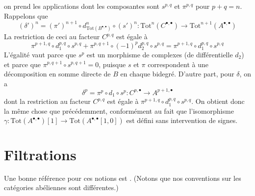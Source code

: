 \begin{remark}
on prend les applications dont les composantes sont $s^{p, q}$ et $\pi^{p, q}$
pour $p + q = n$. Rappelons que
$$
(\delta')^n =
(\pi')^{n + 1} \circ d_{\text{Tot}(B^{\bullet, \bullet})}^n \circ (s')^n :
\text{Tot}^n(C^{\bullet, \bullet}) \to
\text{Tot}^{n + 1}(A^{\bullet, \bullet})
$$
La restriction de ceci au facteur $C^{p, q}$ est égale à
$$
\pi^{p + 1, q} \circ
d_1^{p, q} \circ
s^{p, q} +
\pi^{p, q + 1} \circ
(-1)^p d_2^{p, q} \circ
s^{p, q} =
\pi^{p + 1, q} \circ
d_1^{p, q} \circ
s^{p, q}
$$
L'égalité vaut parce que $s^p$ est un morphisme de complexes (de différentielle $d_2$)
et parce que $\pi^{p, q + 1} \circ s^{p, q + 1} = 0$,
puisque $s$ et $\pi$ correspondent à une décomposition en somme directe de $B$
en chaque bidegré. D'autre part, pour $\delta$, on a
$$
\delta^p =  \pi^p \circ d_1 \circ s^p :
C^{p, \bullet} \to A^{p + 1, \bullet}
$$
dont la restriction au facteur $C^{p, q}$ est égale à
$\pi^{p + 1, q} \circ d_1^{p, q} \circ s^{p, q}$.
On obtient donc la même chose que précédemment, conformément au fait que
l'isomorphisme
$\gamma : \text{Tot}(A^{\bullet, \bullet})[1] \to
\text{Tot}(A^{\bullet, \bullet}[1, 0])$
est défini sans intervention de signes.
\end{remark}








\section{Filtrations}
\label{section-filtrations}

\noindent
Une bonne référence pour ces notions est \cite[section 1]{HodgeII}.
(Notons que nos conventions sur les catégories abéliennes sont différentes.)

